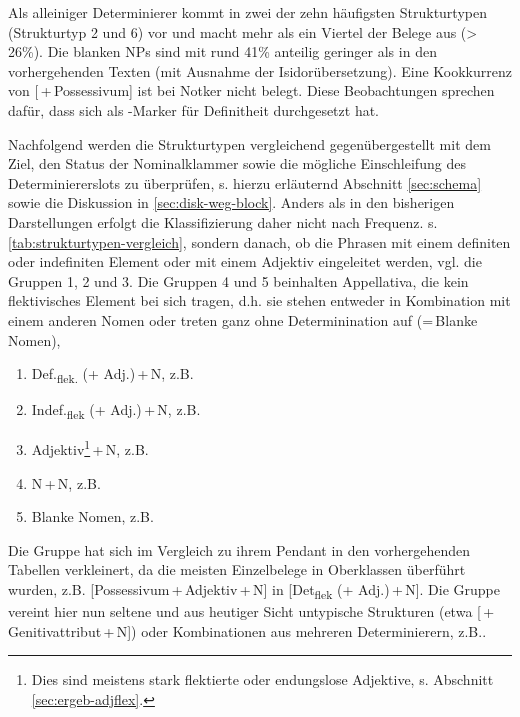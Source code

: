 Als alleiniger Determinierer kommt  in zwei der zehn häufigsten Strukturtypen (Strukturtyp 2 und 6) vor und macht mehr als ein Viertel der Belege aus (> 26\%). Die blanken NPs sind mit rund 41\% anteilig geringer als in den vorhergehenden Texten (mit Ausnahme der Isidorübersetzung). Eine Kookkurrenz von [\,+\,Possessivum] ist bei Notker nicht belegt. Diese Beobachtungen sprechen dafür, dass  sich als -Marker für  Definitheit durchgesetzt hat. 


Nachfolgend werden die Strukturtypen vergleichend gegenübergestellt mit dem Ziel, den Status der Nominalklammer sowie die mögliche Einschleifung des Determiniererslots zu überprüfen, s. hierzu erläuternd Abschnitt \ref{sec:schema} sowie die Diskussion in \ref{sec:disk-weg-block}. Anders als in den bisherigen Darstellungen erfolgt die Klassifizierung  daher nicht nach Frequenz. s. \ref{tab:strukturtypen-vergleich}, sondern danach, ob die Phrasen mit einem definiten oder indefiniten Element oder mit einem Adjektiv eingeleitet werden, vgl. die Gruppen 1, 2 und 3. Die Gruppen 4 und 5 beinhalten  Appellativa, die kein flektivisches Element bei sich tragen, d.h. sie stehen entweder in Kombination mit einem anderen Nomen oder treten ganz ohne Determinination auf (=\,Blanke Nomen), 

\begin{enumerate}
\item Def.\textsubscript{flek.} (+ Adj.)\,+\,N, z.B.  
\item Indef.\textsubscript{flek} (+ Adj.)\,+\,N, z.B. 
\item Adjektiv\footnote{Dies sind meistens stark flektierte oder endungslose Adjektive, s. Abschnitt \ref{sec:ergeb-adjflex}.}\,+\,N, z.B.  
\item N\,+\,N, z.B. 
\item Blanke Nomen, z.B. 
\end{enumerate}

Die Gruppe  hat sich im Vergleich zu ihrem Pendant in den vorhergehenden Tabellen verkleinert, da die meisten Einzelbelege in Oberklassen überführt wurden,  z.B. [Possessivum\,+\,Adjektiv\,+\,N] in [Det\textsubscript{flek} (+ Adj.)\,+\,N]. Die Gruppe vereint hier nun seltene und aus heutiger Sicht untypische Strukturen (etwa [\,+ Genitivattribut\,+\,N]) oder Kombinationen aus mehreren Determinierern, z.B.\linebreak{}. 

